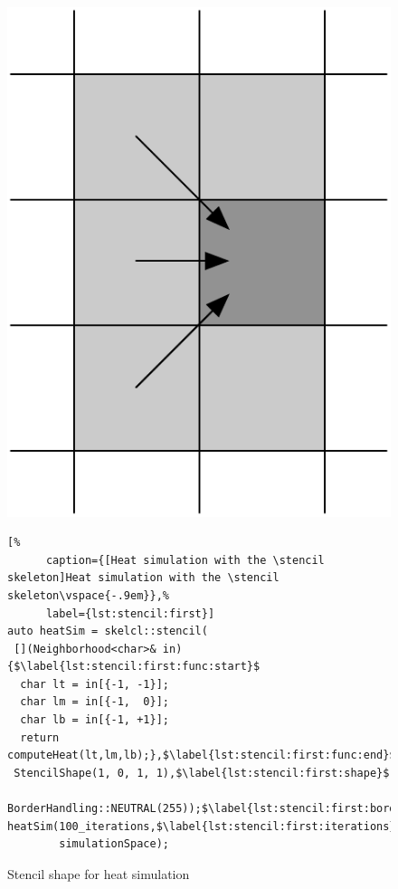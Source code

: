 \begin{figure}[t]
  \begin{minipage}[b]{.38\textwidth}
    \centering
    \includegraphics[width=.65\textwidth]{Figures/HiStencils/heat_transfer}
    \caption{Stencil shape for heat simulation}
    \label{fig:stencil:first:shape}
  \end{minipage}
  \hfill %
  \begin{minipage}[b]{.55\textwidth}
    \begin{lstlisting}[%
      caption={[Heat simulation with the \stencil skeleton]Heat simulation with the \stencil skeleton\vspace{-.9em}},%
      label={lst:stencil:first}]
auto heatSim = skelcl::stencil(
 [](Neighborhood<char>& in) {$\label{lst:stencil:first:func:start}$
  char lt = in[{-1, -1}];
  char lm = in[{-1,  0}];
  char lb = in[{-1, +1}];
  return computeHeat(lt,lm,lb);},$\label{lst:stencil:first:func:end}$
 StencilShape(1, 0, 1, 1),$\label{lst:stencil:first:shape}$
 BorderHandling::NEUTRAL(255));$\label{lst:stencil:first:border}$
heatSim(100_iterations,$\label{lst:stencil:first:iterations}$
        simulationSpace);
    \end{lstlisting}
  \end{minipage}%
\end{figure}

